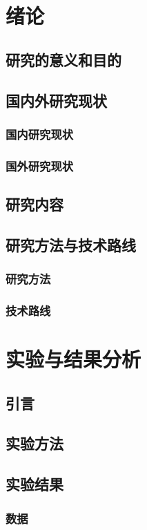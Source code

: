 \documentclass{ctexbook}
\begin{document}
    \tableofcontents
    \chapter{绪论}
    \section{研究的意义和目的}
    \section{国内外研究现状}
    \subsection{国内研究现状}
    \subsection{国外研究现状}
    \section{研究内容}
    \section{研究方法与技术路线}
    \subsection{研究方法}
    \subsection{技术路线}
    \chapter{实验与结果分析}
    \section{引言}
    \section{实验方法}
    \section{实验结果}
    \subsection{数据}
\end{document}

